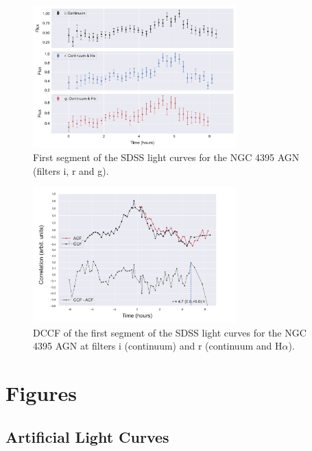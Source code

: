 \documentclass[letterpaper, oneside]{article}
\begin{document}
\begin{figure}[h]
	\centering
	\includegraphics[width=0.7\textwidth]{../lc_plots/ngc4395_sdss_1st_lc.pdf}
	\caption{First segment of the SDSS light curves for the NGC 4395 AGN (filters i, r and g).}
	\label{fig:ngc4395_1st_lcs}
\end{figure}

\begin{figure}[h]
	\centering
	\includegraphics[width=0.7\textwidth]{../CCF_plots/NGC4395_i_r.pdf}
	\caption{DCCF of the first segment of the SDSS light curves for the NGC 4395 AGN at filters i (continuum) and r (continuum and H$\alpha$).}
	\label{fig:ngc4395_ccf}
\end{figure}






\section*{Figures}

\subsection{Artificial Light Curves}
\end{document}
